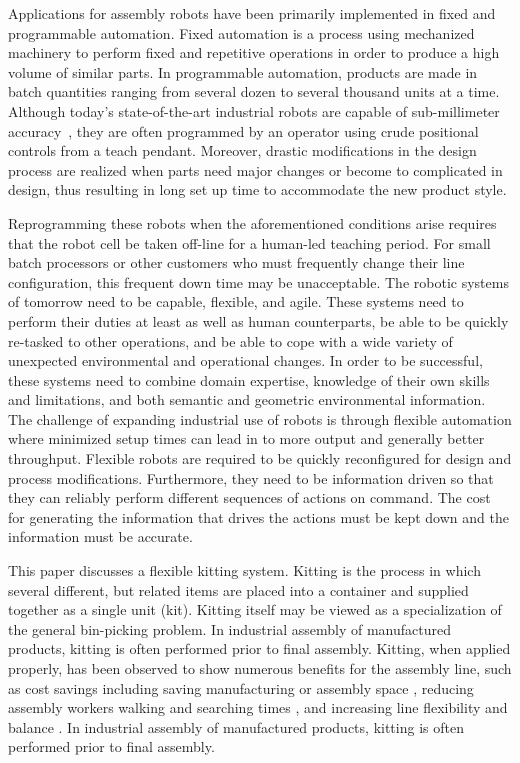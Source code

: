 Applications for assembly robots have been primarily implemented in fixed and programmable automation. Fixed automation is a process using mechanized machinery to perform fixed and repetitive operations in order to produce a high volume of similar parts. In programmable automation, products are made in batch quantities ranging from several dozen to several thousand units at a time. 
Although today's state-of-the-art industrial robots are capable of sub-millimeter accuracy~\cite{RobotAccuracy}, they are often programmed by an operator using crude positional controls from a teach pendant. Moreover, drastic modifications in the design process are realized when parts need major changes or become to complicated in design, thus resulting in long set up time to accommodate the new product style.

Reprogramming these robots when the aforementioned conditions arise requires that the robot cell be taken off-line for a human-led teaching period. For small batch processors or other customers who must frequently change their line configuration, this frequent down time may be unacceptable. The robotic systems of tomorrow need to be capable, flexible, and agile. These systems need to perform their duties at least as well as human counterparts, be able to be quickly re-tasked to other operations, and be able to cope with a wide variety of unexpected environmental and operational changes. In order to be successful, these systems need to combine domain expertise, knowledge of their own skills and limitations, and both semantic and geometric environmental information. The challenge of expanding industrial use of robots is through flexible automation where minimized setup times can lead in to more output and generally better throughput. Flexible robots are required to be quickly reconfigured for design and process modifications. Furthermore, they need to be information driven so that they can reliably perform different sequences of actions on command. The cost for generating the information that drives the actions must be kept down and the information must be accurate.

This paper discusses a flexible kitting system. Kitting is the process in which several different, but related items are placed into a container and supplied together as a single unit (kit). Kitting itself may be viewed as a specialization of the general bin-picking problem. In industrial assembly of manufactured products, kitting is often performed prior to final assembly. Kitting, when applied properly, has been observed to show numerous benefits for the assembly line, such as cost savings \cite{Carlsson_2008} including saving manufacturing or assembly space \cite{Medbo2003}, reducing assembly workers walking and searching times \cite{Schwind1992}, and increasing line flexibility \cite{Bozer1992} and balance \cite{Jiao2000}. In industrial assembly of manufactured products, kitting is often performed prior to final assembly. 

